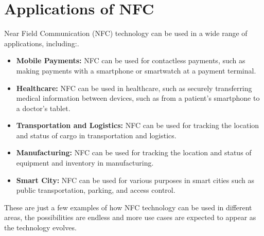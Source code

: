\documentclass[12pt,a4paper]{article}
\begin{document}
\section*{Applications of NFC}
Near Field Communication (NFC) technology can be used in a wide range of applications, including:.
\begin{itemize}
    \item \textbf{Mobile Payments:} NFC can be used for contactless payments, such as making payments with a smartphone or smartwatch at a payment terminal.
    \item \textbf{Healthcare:} NFC can be used in healthcare, such as securely transferring medical information between devices, such as from a patient's smartphone to a doctor's tablet.
    \item \textbf{Transportation and Logistics:} NFC can be used for tracking the location and status of cargo in transportation and logistics.
    \item \textbf{Manufacturing:} NFC can be used for tracking the location and status of equipment and inventory in manufacturing.
    \item \textbf{Smart City:} NFC can be used for various purposes in smart cities such as public transportation, parking, and access control.
\end{itemize}

These are just a few examples of how NFC technology can be used in different areas, the possibilities are endless and more use cases are expected to appear as the technology evolves.

\end{document}
